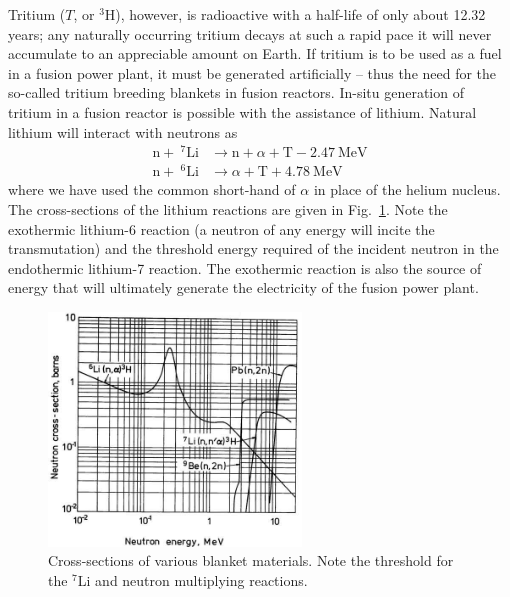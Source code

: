 Tritium ($T$, or $^3$H), however, is radioactive with a half-life of only about 12.32 years; any naturally occurring tritium decays at such a rapid pace it will never accumulate to an appreciable amount on Earth. If tritium is to be used as a fuel in a fusion power plant, it must be generated artificially -- thus the need for the so-called tritium breeding blankets in fusion reactors. In-situ generation of tritium in a fusion reactor is possible with the assistance of lithium. Natural lithium will interact with neutrons as
\begin{subequations}\label{eq:lithium-t}
\begin{align}
	\mathrm{n} + \ ^7\mathrm{Li} &\xrightarrow \ \mathrm{n}+\alpha + \mathrm{T} -2.47\ \text{MeV}\label{eq:li7-t}\\
	\mathrm{n} + \ ^6\mathrm{Li} &\xrightarrow \  \alpha + \mathrm{T} +4.78\ \text{MeV} \label{eq:li6-t}
\end{align}
\end{subequations}
where we have used the common short-hand of $\alpha$ in place of the helium nucleus. The cross-sections of the lithium reactions are given in Fig.~\ref{fig:li-xsects}. Note the exothermic lithium-6 reaction (a neutron of any energy will incite the transmutation) and the threshold energy required of the incident neutron in the endothermic lithium-7 reaction. The exothermic reaction is also the source of energy that will ultimately generate the electricity of the fusion power plant.

\begin{figure}[ht]
	\centering
	\includegraphics[width=0.6\textwidth]{chapters/figures/breeding_xsecs} 
	\caption{Cross-sections of various blanket materials. Note the threshold for the $^7$Li and neutron multiplying reactions.}
	\label{fig:li-xsects}
\end{figure}

